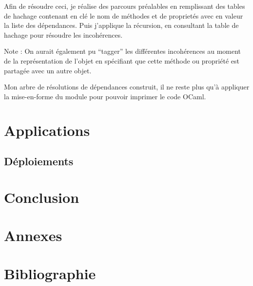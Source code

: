 \documentclass[11pt,a4paper]{report}
\begin{document}
Afin de résoudre ceci, je réalise des parcours préalables en remplissant des tables de hachage contenant
en clé le nom de méthodes et de proprietés avec en valeur la liste des dépendances. 
Puis j'applique la récursion, en consultant la table de hachage pour résoudre les incohérences.

Note : On aurait également pu ``tagger'' les différentes incohérences au moment de la représentation de l'objet
en spécifiant que cette méthode ou propriété est partagée avec un autre objet.\medskip

Mon arbre de résolutions de dépendances construit, il ne reste plus qu'à appliquer la mise-en-forme
du module pour pouvoir imprimer le code OCaml.



\chapter{Applications}
\section{Déploiements}

\chapter{Conclusion}

\chapter{Annexes}

\chapter{Bibliographie}
\end{document}
